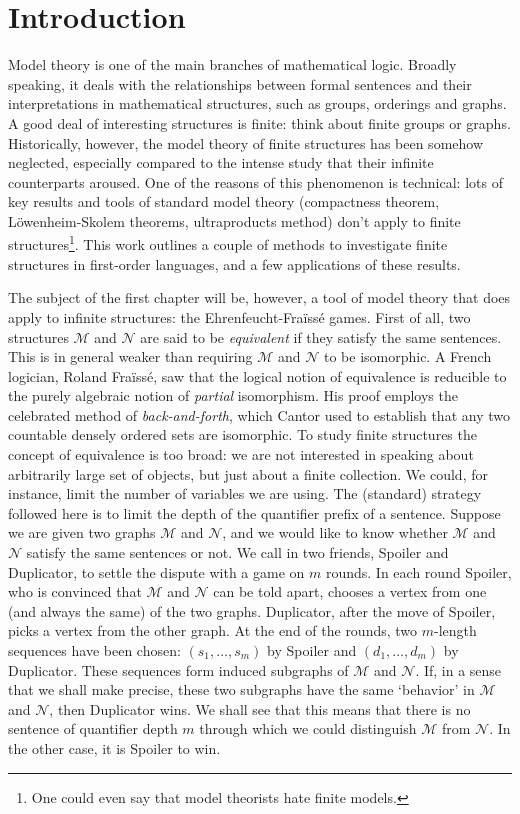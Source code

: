\chapter{Introduction}

Model theory is one of the main branches of mathematical logic. 
Broadly speaking, it deals with the relationships between formal sentences and their interpretations in mathematical structures, such as groups, orderings and graphs. 
A good deal of interesting structures is finite: think about finite groups or graphs. 
Historically, however, the model theory of finite structures has been somehow neglected, especially compared to the intense study that their infinite counterparts aroused. 
One of the reasons of this phenomenon is technical: lots of key results and tools of standard model theory (compactness theorem, L\"owenheim-Skolem theorems, ultraproducts method) don't apply to finite structures\footnote{One could even say that model theorists hate finite models.}. 
This work outlines a couple of methods to investigate finite structures in first-order languages, and a few applications of these results.

The subject of the first chapter will be, however, a tool of model theory that does apply to infinite structures: the Ehrenfeucht-Fra\"iss\'e games. 
First of all, two structures $\mathcal{M}$ and $\mathcal{N}$ are said to be \emph{equivalent} if they satisfy the same sentences. 
This is in general weaker than requiring $\mathcal{M}$ and $\mathcal{N}$ to be isomorphic. 
A French logician, Roland Fra\"iss\'e, saw that the logical notion of equivalence is reducible to the purely algebraic notion of \emph{partial} isomorphism. 
His proof employs the celebrated method of \emph{back-and-forth}, which Cantor used to establish that any two countable densely ordered sets are isomorphic. 
To study finite structures the concept of equivalence is too broad: we are not interested in speaking about arbitrarily large set of objects, but just about a finite collection. 
We could, for instance, limit the number of variables we are using. 
The (standard) strategy followed here is to limit the depth of the quantifier prefix of a sentence. 
Suppose we are given two graphs $\mathcal{M}$ and $\mathcal{N}$, and we would like to know whether $\mathcal{M}$ and $\mathcal{N}$ satisfy the same sentences or not. 
We call in two friends, Spoiler and Duplicator, to settle the dispute with a game on $m$ rounds. 
In each round Spoiler, who is convinced that $\mathcal{M}$ and $\mathcal{N}$ can be told apart, chooses a vertex from one (and always the same) of the two graphs. 
Duplicator, after the move of Spoiler, picks a vertex from the other graph. 
At the end of the rounds, two $m$-length sequences have been chosen: $(s_1, \ldots, s_m)$ by Spoiler and $(d_1, \ldots, d_m)$ by Duplicator. 
These sequences form induced subgraphs of $\mathcal{M}$ and $\mathcal{N}$. 
If, in a sense that we shall make precise, these two subgraphs have the same `behavior' in $\mathcal{M}$ and $\mathcal{N}$, then Duplicator wins. 
We shall see that this means that there is no sentence of quantifier depth $m$ through which we could distinguish $\mathcal{M}$ from $\mathcal{N}$. 
In the other case, it is Spoiler to win. 



